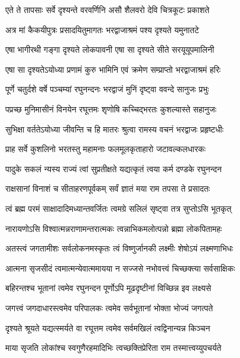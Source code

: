 \twolineshloka
{एते ते तापसाः सर्वे दृश्यन्ते वरवर्णिनि}
{असौ शैलवरो देवि चित्रकूटः प्रकाशते} %

\twolineshloka
{अत्र मां कैकयीपुत्रः प्रसादयितुमागतः}
{भरद्वाजाश्रमं पश्य दृश्यते यमुनातटे} %

\twolineshloka
{एषा भागीरथी गङ्गा दृश्यते लोकपावनी}
{एषा सा दृश्यते सीते सरयूयूपमालिनी} %

\twolineshloka
{एषा सा दृश्यतेऽयोध्या प्रणामं कुरु भामिनि}
{एवं क्रमेण सम्प्राप्तो भरद्वाजाश्रमं हरिः} %

\twolineshloka
{पूर्णे चतुर्दशे वर्षे पञ्चम्यां रघुनन्दनः}
{भरद्वाजं मुनिं दृष्ट्वा ववन्दे सानुजः प्रभुः} %

\twolineshloka
{पप्रच्छ मुनिमासीनं विनयेन रघूत्तमः}
{शृणोषि कच्चिद्भरतः कुशल्यास्ते सहानुजः} %

\twolineshloka
{सुभिक्षा वर्ततेऽयोध्या जीवन्ति च हि मातरः}
{श्रुत्वा रामस्य वचनं भरद्वाजः प्रहृष्टधीः} %

\twolineshloka
{प्राह सर्वे कुशलिनो भरतस्तु महामनाः}
{फलमूलकृताहारो जटावल्कलधारकः} %

\twolineshloka
{पादुके सकलं न्यस्य राज्यं त्वां सुप्रतीक्षते}
{यद्यत्कृतं त्वया कर्म दण्डके रघुनन्दन} %

\twolineshloka
{राक्षसानां विनाशं च सीताहरणपूर्वकम्}
{सर्वं ज्ञातं मया राम तपसा ते प्रसादतः} %

\twolineshloka
{त्वं ब्रह्म परमं साक्षादादिमध्यान्तवर्जितः}
{त्वमग्रे सलिलं सृष्ट्वा तत्र सुप्तोऽसि भूतकृत्} %

\twolineshloka
{नारायणोऽसि विश्वात्मन्नराणामन्तरात्मकः}
{त्वन्नाभिकमलोत्पन्नो ब्रह्मा लोकपितामहः} %

\twolineshloka
{अतस्त्वं जगतामीशः सर्वलोकनमस्कृतः}
{त्वं विष्णुर्जानकी लक्ष्मीः शेषोऽयं लक्ष्मणाभिधः} %

\twolineshloka
{आत्मना सृजसीदं त्वमात्मन्येवात्ममायया}
{न सज्जसे नभोवत्त्वं चिच्छक्त्या सर्वसाक्षिकः} %

\twolineshloka
{बहिरन्तश्च भूतानां त्वमेव रघुनन्दन}
{पूर्णोऽपि मूढदृष्टीनां विच्छिन्न इव लक्ष्यसे} %

\twolineshloka
{जगत्त्वं जगदाधारस्त्वमेव परिपालकः}
{त्वमेव सर्वभूतानां भोक्ता भोज्यं जगत्पते} %

\twolineshloka
{दृश्यते श्रूयते यद्यत्स्मर्यते वा रघूत्तम}
{त्वमेव सर्वमखिलं त्वद्विनान्यन्न किञ्चन} %

\twolineshloka
{माया सृजति लोकांश्च स्वगुणैरहमादिभिः}
{त्वच्छक्तिप्रेरिता राम तस्मात्त्वय्युपचर्यते} %

